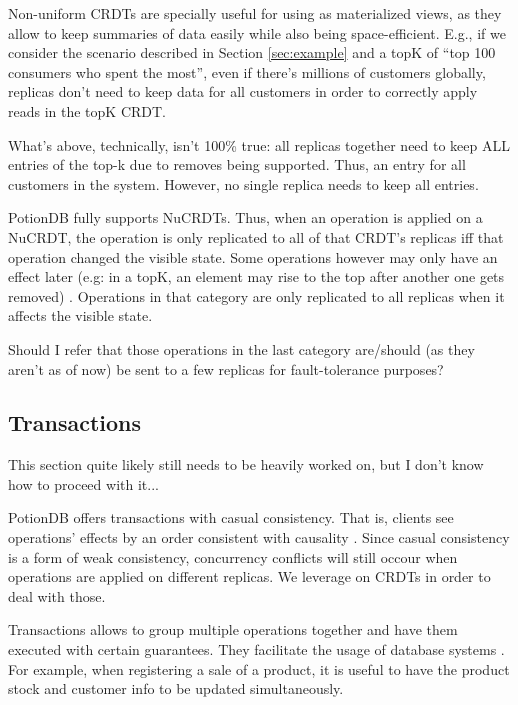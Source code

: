 \documentclass{vldb}
\newcommand{\grumbler}[2]{{\color{red}{\bf #1:} #2}}
\newcommand{\andre}[1]{\grumbler{andre}{#1}}
\begin{document}
Non-uniform CRDTs are specially useful for using as materialized views, as they allow to keep summaries of data easily while also being space-efficient.
E.g., if we consider the scenario described in Section \ref{sec:example} and a topK of ``top 100 consumers who spent the most'', even if there's millions of customers globally, replicas don't need to keep data for all customers in order to correctly apply reads in the topK CRDT.

\andre{What's above, technically, isn't 100\% true: all replicas together need to keep ALL entries of the top-k due to removes being supported. Thus, an entry for all customers in the system. However, no single replica needs to keep all entries.}

PotionDB fully supports NuCRDTs.
Thus, when an operation is applied on a NuCRDT, the operation is only replicated to all of that CRDT's replicas iff that operation changed the visible state.
Some operations however may only have an effect later (e.g: in a topK, an element may rise to the top after another one gets removed) \cite{Cabrita17Nonuniform}.
Operations in that category are only replicated to all replicas when it affects the visible state.

\andre{Should I refer that those operations in the last category are/should (as they aren't as of now) be sent to a few replicas for fault-tolerance purposes?}

\subsection{Transactions}

\andre{This section quite likely still needs to be heavily worked on, but I don't know how to proceed with it...}

PotionDB offers transactions with casual consistency.
That is, clients see operations' effects by an order consistent with causality \cite{???}.
Since casual consistency is a form of weak consistency, concurrency conflicts will still occour when operations are applied on different replicas.
We leverage on CRDTs in order to deal with those.

Transactions allows to group multiple operations together and have them executed with certain guarantees.
They facilitate the usage of database systems \cite{???}.
For example, when registering a sale of a product, it is useful to have the product stock and customer info to be updated simultaneously. %
\end{document}
